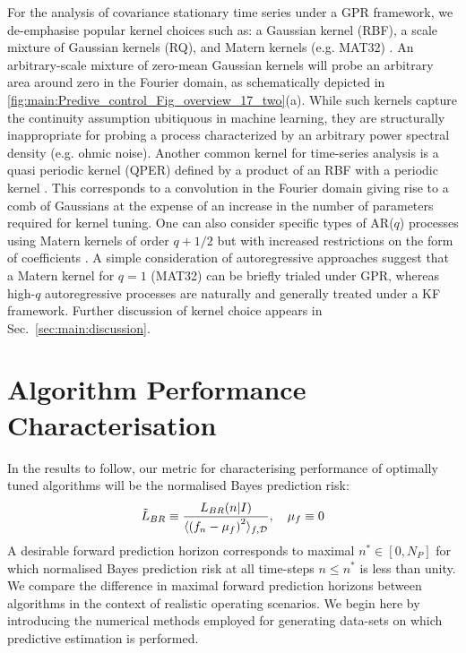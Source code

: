 For the analysis of covariance stationary time series under a GPR framework, we de-emphasise popular kernel choices such as: a Gaussian kernel (RBF),  a scale mixture of Gaussian kernels (RQ), and Matern kernels (e.g. MAT32) \cite{rasmussen2005gaussian,tobar2015learning}. An arbitrary-scale mixture of zero-mean Gaussian kernels will probe an arbitrary area around zero in the Fourier domain, as schematically depicted in \cref{fig:main:Predive_control_Fig_overview_17_two}(a). While such kernels capture the continuity assumption ubitiquous in machine learning, they are structurally inappropriate for probing a process characterized by an arbitrary power spectral density (e.g. ohmic noise). Another common kernel for time-series analysis is a quasi periodic kernel (QPER) defined by a product of an RBF with a periodic kernel \cite{roberts2013gaussian}. This corresponds to a convolution in the Fourier domain giving rise to a comb of Gaussians at the expense of an increase in the number of parameters required for kernel tuning. One can also consider specific types of AR($q$) processes using Matern kernels of order $q+1/2$ but with increased restrictions on the form of coefficients \cite{rasmussen2005gaussian,stein2012interpolation}. A simple consideration of autoregressive approaches suggest that a Matern kernel for $q=1$ (MAT32) can be briefly trialed under GPR, whereas high-$q$ autoregressive processes are naturally and generally treated under a KF framework.  Further discussion of kernel choice appears in Sec.~\ref{sec:main:discussion}.

\section{Algorithm Performance Characterisation \label{sec:main:Performance}}

In the results to follow, our metric for characterising performance of optimally tuned algorithms will be the normalised Bayes prediction risk:
\begin{align}
	\tilde{L}_{BR} \equiv \frac{L_{BR}(n|I)}{\langle \left(f_n - \mu_f \right)^2 \rangle_{f, \mathcal{D}}}, \quad \mu_f \equiv 0
\end{align}
A desirable forward prediction horizon corresponds to maximal $n^* \in [0, N_P]$ for which normalised Bayes prediction risk at all time-steps $n \leq n^*$ is less than unity. We compare the difference in maximal forward prediction horizons between algorithms in the context of realistic operating scenarios.  We begin here by introducing the numerical methods employed for generating data-sets on which predictive estimation is performed.

